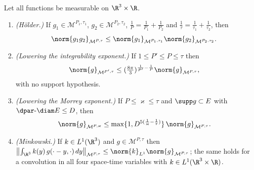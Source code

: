 \documentclass[11pt,reqno]{amsart}
\begin{document}
\begin{lemma}\label{lem:morrey-minkowski}
Let all functions be measurable on $\R^{3}\times\R$.
\begin{enumerate}
\item[(i)] \emph{(H\"older.)} If $g_{1}\in\mathcal{M}^{P_{1},\tau_{1}}$,
  $g_{2}\in\mathcal{M}^{P_{2},\tau_{2}}$,
  $\tfrac1P=\tfrac1{P_{1}}+\tfrac1{P_{2}}$ and
  $\tfrac1\tau=\tfrac1{\tau_{1}}+\tfrac1{\tau_{2}}$, then
  \begin{equation}\label{eq:morrey-holder}
    \norm{g_{1}g_{2}}_{\mathcal{M}^{P,\tau}}
    \le\norm{g_{1}}_{\mathcal{M}^{P_{1},\tau_{1}}}
       \norm{g_{2}}_{\mathcal{M}^{P_{2},\tau_{2}}} .
  \end{equation}
\item[(ii)] \emph{(Lowering the integrability exponent.)} If
  $1\le P'\le P\le\tau$ then
\[
\norm{g}_{\mathcal{M}^{P',\tau}}\le(\tfrac{8\pi}{3})^{\frac1{P'}-\frac1P}
   \norm{g}_{\mathcal{M}^{P,\tau}}
,
\] with no support hypothesis.
\item[(iii)] \emph{(Lowering the Morrey exponent.)} If $P\le\varkappa\le\tau$ and
  $\supp g\subset E$ with $\dpar\text{-}\diam E\le D$, then
  \begin{equation}\label{eq:morrey-lower}
    \norm{g}_{\mathcal{M}^{P,\varkappa}}
    \le\max\{1,D^{5(\frac1\varkappa-\frac1\tau)}\}\,
       \norm{g}_{\mathcal{M}^{P,\tau}} .
  \end{equation}
\item[(iv)] \emph{(Minkowski.)} If $k\in L^{1}(\R^{3})$ and
  $g\in\mathcal{M}^{P,\tau}$ then
  $\bigl\|\int_{\R^{3}}k(y)\,g(\cdot-y,\cdot)\,dy\bigr\|_{\mathcal{M}^{P,\tau}}
   \le\norm{k}_{L^{1}}\norm{g}_{\mathcal{M}^{P,\tau}}$; the same holds for a
  convolution in all four space-time variables with $k\in L^{1}(\R^{3}\times\R)$.
\end{enumerate}
\end{lemma}
\end{document}

